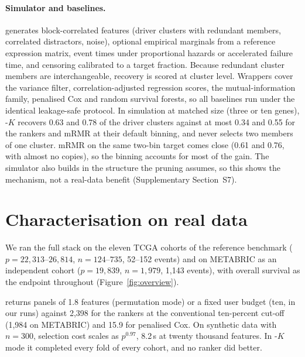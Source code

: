 \paragraph{Simulator and baselines.}  generates
block-correlated features (driver clusters with redundant members, correlated
distractors, noise), optional empirical marginals from a reference expression
matrix, event times under proportional hazards or accelerated failure time, and
censoring calibrated to a target fraction. Because redundant cluster members are
interchangeable, recovery is scored at cluster level. Wrappers cover the
variance filter, correlation-adjusted regression scores, the
mutual-information family, penalised Cox and random survival forests, so all
baselines run under the identical leakage-safe protocol. In simulation at
matched size (three or ten genes), -$K$ recovers 0.63 and 0.78 of
the driver clusters against at most 0.34 and 0.55 for the rankers and mRMR at their
default binning, and never selects two members of one cluster. mRMR on the same two-bin
target comes close (0.61 and 0.76, with almost no copies), so the binning accounts for
most of the gain. The simulator also builds in the structure the pruning assumes, so
this shows the mechanism, not a real-data benefit (Supplementary Section~S7).

\section{Characterisation on real data}

We ran the full stack on the eleven TCGA cohorts of the reference benchmark
($p = 22{,}313$--$26{,}814$, $n = 124$--$735$, 52--152 events) and on METABRIC
\citep{metabric2012,metabric2016,metabric2019} as an independent cohort
($p = 19{,}839$, $n = 1{,}979$, 1{,}143
events), with overall survival as the endpoint throughout (Figure~\ref{fig:overview}).

 returns panels of 1.8 features (permutation mode) or a fixed
user budget (ten, in our runs) against 2{,}398 for the rankers at the
conventional ten-percent cut-off (1{,}984 on METABRIC) and 15.9 for penalised Cox.
On synthetic data with $n = 300$, selection cost scales as $p^{0.97}$, 8.2\,s at
twenty thousand features. In -$K$ mode it completed every fold of every
cohort, and no ranker did better.

